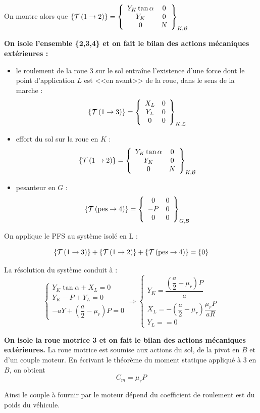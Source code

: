 \documentclass[10pt]{article}
\begin{document}
On montre alors que $\torseurstat{T}{1}{2}=\torseurcol{Y_K\tan\alpha}{Y_K}{0}{0}{0}{N}{K,\mathcal{B}}$

\textbf{On isole l'ensemble \{2,3,4\} et on fait le bilan des actions mécaniques extérieures :}
\begin{itemize}
\item le roulement de la roue 3 sur le sol entraîne l'existence d'une force dont le point d'application $L$ est <<en avant>> de la roue, dans le sens de la marche :
$$\torseurstat{T}{1}{3}=\torseurcol{X_L}{Y_L}{0}{0}{0}{0}{K,\mathcal{L}}$$
\item effort du sol sur la roue en $K$ :
$$\torseurstat{T}{1}{2}=\torseurcol{Y_K\tan\alpha}{Y_K}{0}{0}{0}{N}{K,\mathcal{B}}$$
\item pesanteur en $G$ :
$$\torseurstat{T}{\text{pes}}{4}=\torseurcol{0}{-P}{0}{0}{0}{0}{G,\mathcal{B}}$$
\end{itemize}

On applique le PFS au système isolé en L :

$$\torseurstat{T}{1}{3} + \torseurstat{T}{1}{2} + \torseurstat{T}{\text{pes}}{4} =\{0\}$$

La résolution du système conduit à :
$$
\left\{
\begin{array}{l}
Y_K\tan\alpha + X_L = 0 \\
Y_K-P + Y_L = 0 \\
-aY + \left( \dfrac{a}{2}-\mu_r\right) P = 0
\end{array}
\right.
\Longrightarrow
\left\{
\begin{array}{l}
Y_K= \dfrac{\left( \dfrac{a}{2} - \mu_r\right) P}{a} \\
X_L = - \left( \dfrac{a}{2} - \mu_r \right) \dfrac{\mu_r P}{aR} \\
Y_L = = 0
\end{array}
\right.
$$

\textbf{On isole la roue motrice 3 et on fait le bilan des actions mécaniques extérieures.}
La roue motrice est soumise aux actions du sol, de la pivot en $B$ et d'un couple moteur. 
En écrivant le théorème du moment statique appliqué à 3 en $B$, on obtient 
$$
C_m = \mu_r P
$$

Ainsi le couple à fournir par le moteur dépend du coefficient de roulement est du poids du véhicule.

\begin{thebibliography}{2}
\end{thebibliography}
\end{document}
